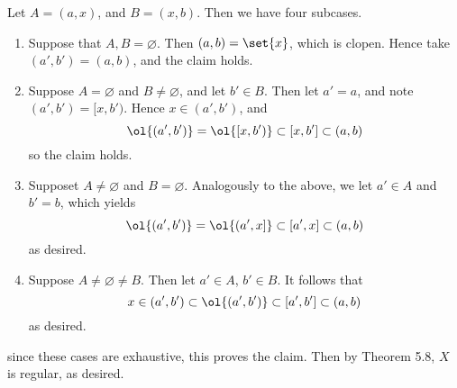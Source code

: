 \documentclass{fkpset}
\begin{document}
\begin{solution}
\begin{enumerate}[label=(\arabic*)]
        Let $A = (a, x)$, and $B = (x, b)$. Then we have four
        subcases.
        \begin{enumerate}[label=\roman*)]
          \item Suppose that $A,B = \varnothing$. Then $(a,b) =
            \set{x}$, which is clopen. Hence take $(a',b') = (a,b)$,
            and the claim holds. \cmark
          \item Suppose $A = \varnothing$ and $B \neq \varnothing$,
            and let $b' \in B$. Then let $a'=a$, and note $(a',b') =
            [x, b')$. Hence $x \in (a',b')$, and
            \[
              \ol{(a', b')} = \ol{[x, b')} \subset [x,b'] \subset
              (a,b)
            \]
            so the claim holds. \cmark
          \item Supposet $A \neq \varnothing$ and $B = \varnothing$.
            Analogously to the above, we let $a' \in A$ and $b'=b$,
            which yields
            \[
              \ol{(a',b')} = \ol{(a',x]} \subset [a',x] \subset (a,b)
            \]
            as desired. \cmark
          \item Suppose $A \neq \varnothing \neq B$. Then let $a' \in
            A$, $b' \in B$. It follows that
            \[
              x \in (a',b') \subset \ol{(a',b')} \subset [a',b']
              \subset (a,b)
            \]
            as desired. \cmark
        \end{enumerate}
        since these cases are exhaustive, this proves the claim. Then
        by Theorem 5.8, $X$ is regular, as desired.
    \end{enumerate}
  \end{solution}
  \clearpage
\end{document}
